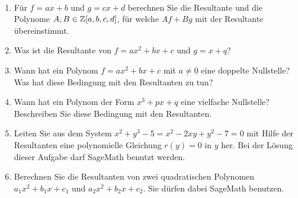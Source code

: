 \documentclass[11pt]{article}
\numberwithin{equation}{section}
\begin{document}
\begin{aufgaben} {\  } 
	\begin{enumerate}
			\item Für $f=a x +b$ und $g = c x+ d$ berechnen Sie die Resultante und die Polynome $A,B \in \mathbb{Z}[a,b,c,d]$, für welche $A f + B g$  mit der Resultante übereinstimmt. 
			\item Was ist die Resultante von $f = a x^2 + b x + c$ und $g = x+q$? 
			\item Wann hat ein Polynom $ f = a x^2 + b x + c$ mit $a \ne 0$ eine doppelte Nullstelle? Was hat diese Bedingung mit den Resultanten zu tun? 
			\item Wann hat ein Polynom der Form $x^3 + p x + q$ eine vielfache Nullstelle? Beschreiben Sie diese Bedingung mit den Resultanten. 
			\item Leiten Sie aus dem System $x^2 +  y^3 - 5 =  x^2 - 2 xy + y^2 - 7 = 0$ mit Hilfe der Resultanten eine polynomielle Gleichung  $r(y)=0$  in $y$ her. Bei der Lösung dieser Aufgabe darf SageMath benutzt werden. 
			\item Berechnen Sie die Resultanten von zwei quadratischen Polynomen $a_1 x^2 + b_1 x + c_1$ und $a_2 x^2 + b_2 x + c_2$. Sie dürfen dabei SageMath benutzen. 
	\end{enumerate} 
\end{aufgaben} 
\end{document}
